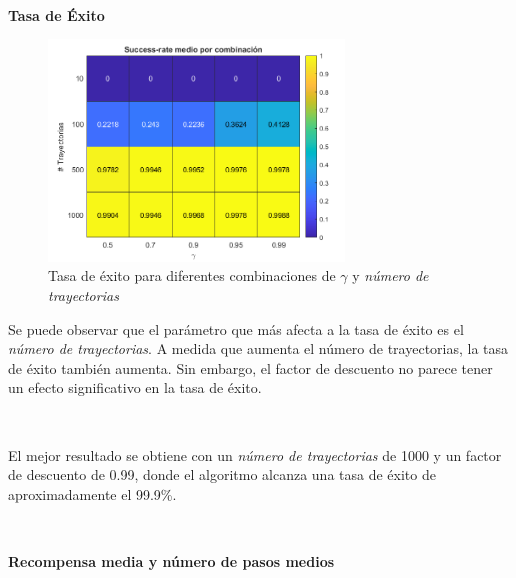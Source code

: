\

\textbf{Tasa de Éxito}

\begin{figure}[H]
    \centering
    \includegraphics[width=0.7\textwidth]{../../experiments/directEstimation/experiment-1/results/success.png}
    \caption{Tasa de éxito para diferentes combinaciones de $\gamma$ y \textit{número de trayectorias}}
    \label{fig:directEstimation-success}
\end{figure}

Se puede observar que el parámetro que más afecta a la tasa de éxito es el \textit{número de trayectorias}. A medida que aumenta el número de trayectorias, la tasa de éxito también aumenta. Sin embargo, el factor de descuento no parece tener un efecto significativo en la tasa de éxito.

\

El mejor resultado se obtiene con un \textit{número de trayectorias} de 1000 y un factor de descuento de 0.99, donde el algoritmo alcanza una tasa de éxito de aproximadamente el 99.9\%.

\

\textbf{Recompensa media y número de pasos medios}

